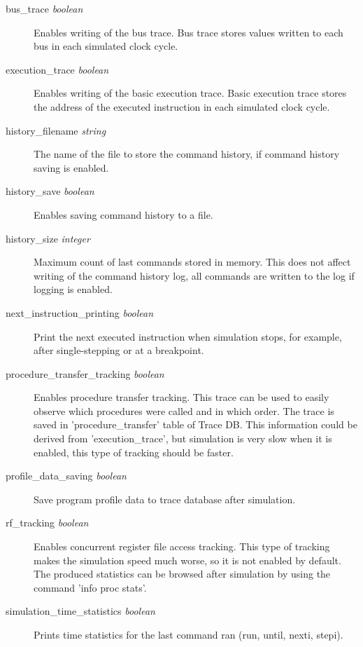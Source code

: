 \documentclass[a4paper,twoside]{tceusermanual}
\begin{document}
\begin{description}
\item[bus\_trace {\emph{boolean}}] %
  Enables writing of the bus trace. Bus trace stores values written to each bus
in each simulated clock cycle.

\item[execution\_trace  {\emph{boolean}}] %
  Enables writing of the basic execution trace. Basic execution trace stores the
address of the executed instruction in each simulated clock cycle. 

\item[history\_filename {\emph{string}}]%
  The name of the file to store the command history, if command history saving
is enabled.

\item[history\_save {\emph{boolean}}] %
  Enables saving command history to a file.

\item[history\_size {\emph{integer}}]%
 Maximum count of last commands stored in memory. This does not affect writing
of the command history log, all commands are written to the log if logging is
enabled.

\item[next\_instruction\_printing {\emph{boolean}}]%
Print the next executed instruction when simulation stops, for example,
after single-stepping or at a breakpoint. 

\item[procedure\_transfer\_tracking {\emph{boolean}}]%
 Enables procedure transfer tracking. This trace can be used to easily
observe which procedures were 
 called and in which order. The trace is saved in 'procedure\_transfer'
table of Trace DB. This information
 could be derived from 'execution\_trace', but simulation is very slow when
it is enabled, this type of
 tracking should be faster.

\item[profile\_data\_saving {\emph{boolean}}]%
Save program profile data to trace database after simulation.

\item[rf\_tracking {\emph{boolean}}]%
 Enables concurrent register file access tracking. This type of tracking
makes the simulation
 speed much worse, so it is not enabled by default. The produced statistics can
be browsed after simulation by using the command 'info proc stats'.

\item[simulation\_time\_statistics {\emph{boolean}}]%
Prints time statistics for the last command ran (run, until, nexti, stepi).


\end{description}
\end{document}
